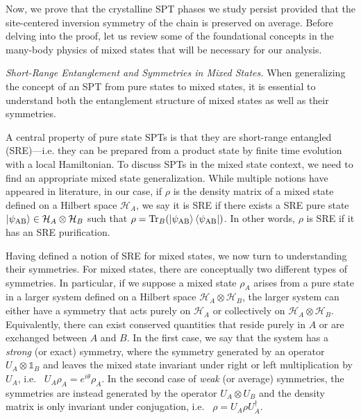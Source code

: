 \documentclass[preprint,superscriptaddress,floatfix, nofootinbib]{revtex4-2}
\begin{document}
Now, we prove that the crystalline SPT phases we study persist provided that the site-centered inversion symmetry of the chain is preserved on average.
%
Before delving into the proof, let us review some of the foundational concepts in the many-body physics of mixed states that will be necessary for our analysis.

\textit{Short-Range Entanglement and Symmetries in Mixed States.} When generalizing the concept of an SPT from pure states to mixed states, it is essential to understand both the entanglement structure of mixed states as well as their symmetries.

A central property of pure state SPTs is that they are short-range entangled (SRE)---i.e. they can be prepared from a product state by finite time evolution with a local Hamiltonian.
%
To discuss SPTs in the mixed state context, we need to find an appropriate mixed state generalization.
%
While multiple notions have appeared in literature\cite{Ma2023, Chen2024}, in our case, if $\rho$ is the density matrix of a mixed state defined on a Hilbert space $\mathcal{H}_A$, we say it is SRE if there exists a SRE pure state $\ket{\psi_{\text{AB}}} \in \mathcal{H}_A \otimes \mathcal{H}_B$ such that $\rho = \text{Tr}_{B}(\ket{\psi_{\text{AB}}} \bra{\psi_{\text{AB}}})$.
%
In other words, $\rho$ is SRE if it has an SRE purification.


Having defined a notion of SRE for mixed states, we now turn to understanding their symmetries.
%
For mixed states, there are conceptually two different types of symmetries.
%
In particular, if we suppose a mixed state $\rho_A$ arises from a pure state in a larger system defined on a Hilbert space $\mathcal{H}_{A} \otimes \mathcal{H}_{B}$, the larger system can either have a symmetry that acts purely on $\mathcal{H}_A$ or collectively on $\mathcal{H}_A \otimes \mathcal{H}_B$.
%
Equivalently, there can exist conserved quantities that reside purely in $A$ or are exchanged between $A$ and $B$.
%
In the first case, we say that the system has a \textit{strong}  (or exact) symmetry, where the symmetry generated by an operator $U_A \otimes \mathds{1}_{B}$ and leaves the mixed state invariant under right or left multiplication by $U_A$, i.e.~ $U_A \rho_A = e^{i \theta} \rho_A$.
%
In the second case of \textit{weak} (or average) symmetries, the symmetries are instead generated by the operator $U_A \otimes U_B$ and the density matrix is only invariant under conjugation, i.e.~  $\rho = U_A \rho U_A^{\dagger}$.
\end{document}
